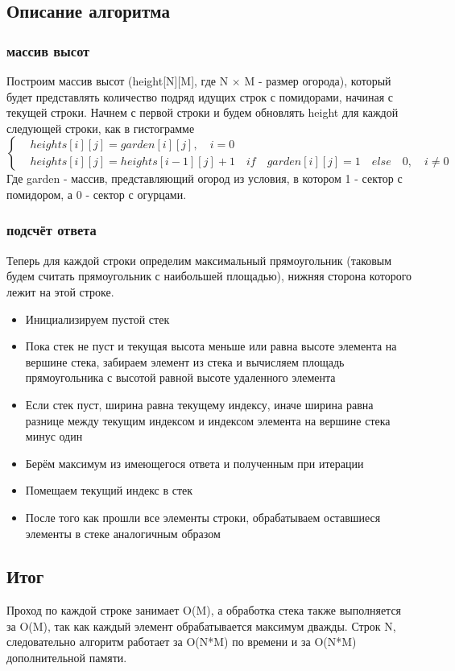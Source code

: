 \documentclass[a4paper,14pt]{article}
\begin{document}
\subsection{Описание алгоритма}
\subsubsection{массив высот}
Построим массив высот (height[N][M], где N $\times$ M - размер огорода), который будет представлять количество подряд идущих строк с помидорами, начиная с текущей строки. Начнем с первой строки и будем обновлять height для каждой следующей строки, как в гистограмме 
$$
\left\{
\begin{aligned}
& heights[i][j] = garden[i][j],\quad i = 0\\
& heights[i][j] = heights[i - 1][j] + 1 \quad if \quad garden[i][j] = 1 \quad else \quad 0,\quad i \neq 0 
\end{aligned}
\right.
$$
Где garden - массив, представляющий огород из условия, в котором 1 - сектор с помидором, а 0 - сектор с огурцами.

\subsubsection{подсчёт ответа}
Теперь для каждой строки определим максимальный прямоугольник (таковым будем считать прямоугольник с наибольшей площадью), нижняя  сторона которого лежит на этой строке.

\begin{itemize}
    \item Инициализируем пустой стек
    \item Пока стек не пуст и текущая высота меньше или равна высоте элемента на вершине стека, забираем элемент из стека и вычисляем площадь прямоугольника с высотой равной высоте удаленного элемента
    \item Если стек пуст, ширина равна текущему индексу, иначе ширина равна разнице между текущим индексом и индексом элемента на вершине стека минус один
    \item Берём максимум из имеющегося ответа и полученным при итерации
    \item Помещаем текущий индекс в стек
    \item После того как прошли все элементы строки, обрабатываем оставшиеся элементы в стеке аналогичным образом
\end{itemize}

\subsection{Итог}
Проход по каждой строке занимает O(M), а обработка стека также выполняется за O(M), так как каждый элемент обрабатывается максимум дважды. Строк N, следовательно алгоритм работает за O(N*M) по времени и за O(N*M) дополнительной памяти.
\end{document}
